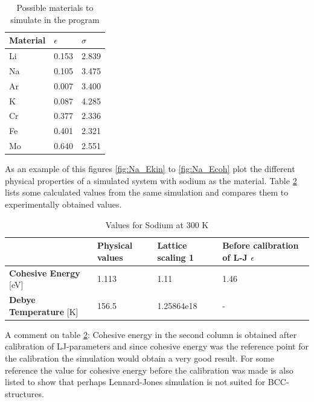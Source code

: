 \documentclass[12pt,a4paper]{article}
\begin{document}
\begin{table}[h]
\begin{center}
\caption{Possible materials to simulate in the program}
\label{tab:materials_LJ}
\begin{tabular}{|l|l|l|}
\hline
\textbf{Material} & \textbf{\(\epsilon\)} & \textbf{\(\sigma\)} \\
\hline
Li & 0.153 & 2.839 \\
\hline
Na & 0.105 & 3.475 \\
\hline
Ar & 0.007 & 3.400 \\
\hline
K & 0.087 & 4.285 \\
\hline
Cr & 0.377 & 2.336 \\
\hline
Fe & 0.401 & 2.321 \\
\hline
Mo & 0.640 & 2.551 \\
\hline
\end{tabular}
\end{center}
\end{table}

As an example of this figures \ref{fig:Na_Ekin} to \ref{fig:Na_Ecoh} plot the different physical properties of a simulated system with sodium as the material. Table \ref{tab:natrium} lists some calculated values from the same simulation and compares them to experimentally obtained values.

\begin{table}[h]
\begin{center}
\caption{Values for Sodium at 300 K}
\label{tab:natrium}
\begin{tabular}{| p{} | p{} | p{} | p{} |}
\hline
  & \textbf{Physical values} & \textbf{Lattice scaling 1} & \textbf{Before calibration of L-J \(\epsilon\)} \\
\hline
\textbf{Cohesive Energy} [eV] & 1.113 & 1.11 & 1.46 \\
\hline
\textbf{Debye Temperature} [K] & 156.5 & 1.25864e18 & - \\
\hline
\end{tabular}
\end{center}
\end{table}

A comment on table \ref{tab:natrium}: Cohesive energy in the second column is obtained after calibration of LJ-parameters and since cohesive energy was the reference point for the calibration the simulation would obtain a very good result. For some reference the value for cohesive energy before the calibration was made is also listed to show that perhaps Lennard-Jones simulation is not suited for BCC-structures.
\end{document}
